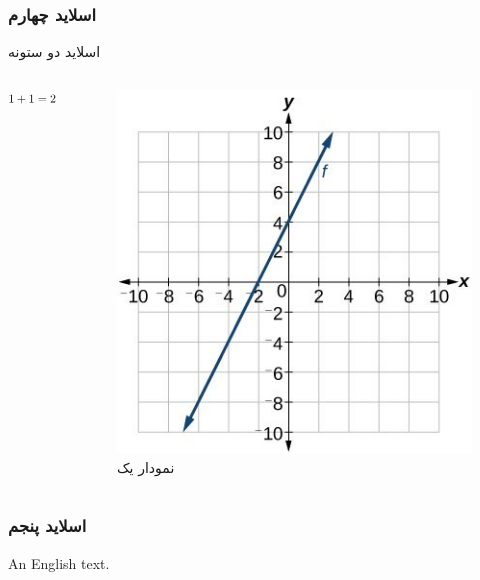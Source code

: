 \documentclass[babel={layout=lists},9pt]{beamer-rl}
\newcommand*{\Scale}[2][4]{\scalebox{#1}{$#2$}}%
\begin{document}
	\begin{frame}
		\frametitle{اسلاید چهارم}
		اسلاید دو ستونه
		\begin{columns}[T] 
			\begin{column}{.48\textwidth}
				\vspace{30pt}
				\begin{equation*}
				\Scale[0.85]{ %
					\begin{aligned}
					1+1=2
					\end{aligned}
				}
				\end{equation*}
			\end{column}
			\hfill
			\begin{column}{.48\textwidth}
				\begin{figure}
					\centering
					\includegraphics[width=1\linewidth]{assets/plot.jpg}
					\caption{نمودار یک}
				\end{figure}
			\end{column}
		\end{columns}
	\end{frame}
	
	
	
	\begin{frame}
		\frametitle{اسلاید پنجم}
		
		{\selectlanguage{nil}
			An English text.
		}
	\end{frame}
	
\end{document}
